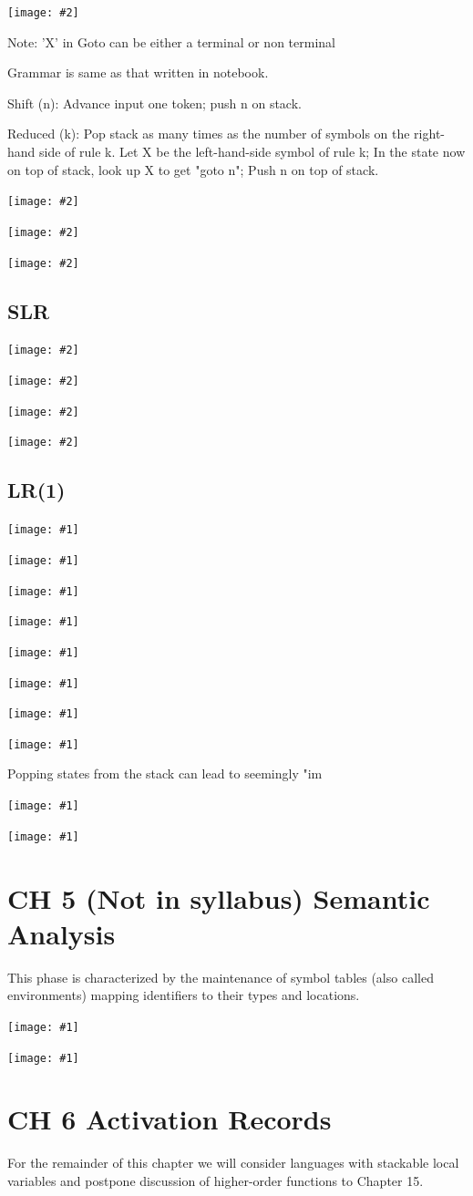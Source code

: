 \documentclass[8pt, a4paper, oneside, twocolumn]{extarticle}
\newcommand{\iph}[2]{
    \texttt{[image: \#2]}
}
\newcommand{\ph}[1]{
    \texttt{[image: \#1]}
}
\begin{document}
\iph{0.5}{lr0}

Note: 'X' in Goto can be either a terminal or non terminal
 
Grammar is same as that written in notebook.

Shift (n): Advance input one token; push n on stack.

Reduced (k): Pop stack as many times as the number of
symbols on the right-hand side of rule k.
Let X be the left-hand-side symbol of rule k;
In the state now on top of stack, look up X to get "goto n";
Push n on top of stack.
\iph{0.5}{lr0g}

\iph{0.5}{lr01}

\iph{0.5}{lr02}



\subsection{SLR}

\iph{0.35}{slr}

\iph{0.5}{slr2}

\iph{0.5}{slrg1}

\iph{0.5}{slrg2}

\subsection{LR(1)}

\ph{lr1}

\ph{lr2}

\ph{hier}

\ph{yaccpref}

\ph{yaccpref2}

\ph{yaccpref3}

\ph{yaccpref4}

\ph{yaccpref5}

Popping states from the stack can lead to seemingly "im

\ph{err}

\ph{gerr}

\section{CH 5 (Not in syllabus) Semantic Analysis}
This phase is characterized by the maintenance of symbol tables (also called
environments) mapping identifiers to their types and locations.

\ph{sem1}

\ph{sem2}

\section{CH 6 Activation Records}
For the remainder of this chapter we will consider languages with stackable
local variables and postpone discussion of higher-order functions to 
Chapter 15.
\end{document}
